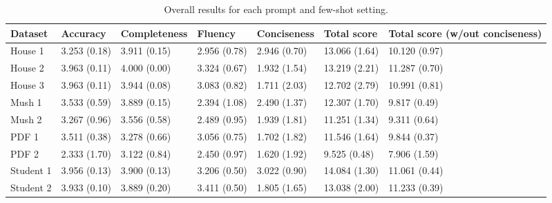 \begin{table}
\caption{Overall results for each prompt and few-shot setting.}
\begin{tabular}{lllllll}
\toprule
Dataset & Accuracy & Completeness & Fluency & Conciseness & Total score & Total score (w/out conciseness) \\
\midrule
House 1 & 3.253 (0.18) & 3.911 (0.15) & 2.956 (0.78) & 2.946 (0.70) & 13.066 (1.64) & 10.120 (0.97) \\
House 2 & 3.963 (0.11) & 4.000 (0.00) & 3.324 (0.67) & 1.932 (1.54) & 13.219 (2.21) & 11.287 (0.70) \\
House 3 & 3.963 (0.11) & 3.944 (0.08) & 3.083 (0.82) & 1.711 (2.03) & 12.702 (2.79) & 10.991 (0.81) \\
Mush 1 & 3.533 (0.59) & 3.889 (0.15) & 2.394 (1.08) & 2.490 (1.37) & 12.307 (1.70) & 9.817 (0.49) \\
Mush 2 & 3.267 (0.96) & 3.556 (0.58) & 2.489 (0.95) & 1.939 (1.81) & 11.251 (1.34) & 9.311 (0.64) \\
PDF 1 & 3.511 (0.38) & 3.278 (0.66) & 3.056 (0.75) & 1.702 (1.82) & 11.546 (1.64) & 9.844 (0.37) \\
PDF 2 & 2.333 (1.70) & 3.122 (0.84) & 2.450 (0.97) & 1.620 (1.92) & 9.525 (0.48) & 7.906 (1.59) \\
Student 1 & 3.956 (0.13) & 3.900 (0.13) & 3.206 (0.50) & 3.022 (0.90) & 14.084 (1.30) & 11.061 (0.44) \\
Student 2 & 3.933 (0.10) & 3.889 (0.20) & 3.411 (0.50) & 1.805 (1.65) & 13.038 (2.00) & 11.233 (0.39) \\
\bottomrule
\end{tabular}
\end{table}
